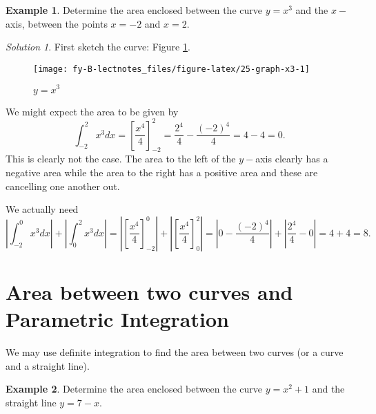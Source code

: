 \documentclass[
  11pt,
  oneside]{book}
\newcommand{\slide}{}
\theoremstyle{definition}
\theoremstyle{definition}
\newtheorem{example}{Example}[chapter]
\theoremstyle{definition}
\theoremstyle{definition}
\theoremstyle{remark}
\newtheorem*{solution}{Solution}
\begin{document}
\slide

\begin{example}
Determine the area enclosed between the curve \(y=x^3\) and the \(x-\)axis, between the points \(x=-2\) and \(x=2\).
\end{example}

\begin{solution}
First sketch the curve: Figure \ref{fig:25-graph-x3}.

\begin{figure}

{\centering \texttt{[image: fy-B-lectnotes\_files/figure-latex/25-graph-x3-1]} 

}

\caption{$y=x^3$}\label{fig:25-graph-x3}
\end{figure}

We might expect the area to be given by
\[
\int_{-2}^2x^3dx = \left[\frac{x^4}4\right]_{-2}^2 = \frac{2^4}4-\frac{(-2)^4}4 = 4-4 = 0.
\]
This is clearly not the case. The area to the left of the \(y-\)axis clearly has a negative area while the area to the right has a positive area and these are cancelling one another out.

We actually need
\[
\left|\int_{-2}^0x^3dx\right|+\left|\int_0^2x^3dx\right| = \left|\left[\frac{x^4}4\right]_{-2}^0\right|+\left|\left[\frac{x^4}4\right]_{0}^2\right| = \left|0-\frac{(-2)^4}4\right|+\left|\frac{2^4}4-0\right| = 4+4=8.
\]
\end{solution}

\slide

\section{Area between two curves and Parametric Integration}\label{area-between-two-curves-and-parametric-integration}

We may use definite integration to find the area between two curves (or a curve and a straight line).

\begin{example}
Determine the area enclosed between the curve \(y=x^2+1\) and the straight line \(y=7-x\).
\end{example}
\end{document}
